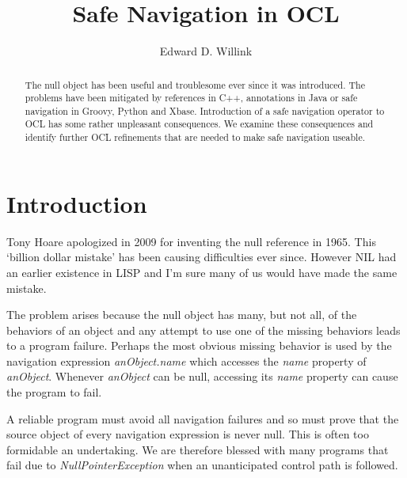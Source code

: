 \documentclass{llncs}
\begin{document}
%
\mainmatter              %
%
\title{Safe Navigation in OCL}
%
%
\author{Edward D. Willink}
%
%
%


\maketitle              %

\begin{abstract}
The null object has been useful and troublesome ever since it was introduced.
The problems have been mitigated by references in C++, annotations in Java or safe navigation in Groovy, Python and Xbase.
Introduction of a safe navigation operator to OCL has some rather unpleasant consequences. We examine these
consequences and identify further OCL refinements that are needed to make safe navigation useable.

\end{abstract}
%
\section{Introduction}
%
Tony Hoare apologized in 2009\cite{Hoare-mistake} for inventing the null reference in 1965. This `billion dollar mistake' has been causing difficulties ever since. However NIL had an earlier existence in LISP and I'm sure many of us would have made the same mistake.

The problem arises because the null object has many, but not all, of the behaviors of an object and any attempt to use one of the missing behaviors leads to a program failure. Perhaps the most obvious missing behavior is used by the navigation expression \emph{anObject.name} which accesses the \emph{name} property of \emph{anObject}. Whenever \emph{anObject} can be null, accessing its \emph{name} property can cause the program to fail.

A reliable program must avoid all navigation failures and so must prove that the source object of every navigation expression is never null. This is often too formidable an undertaking. We are therefore blessed with many programs that fail due to \emph{NullPointerException} when an unanticipated control path is followed.
\end{document}
